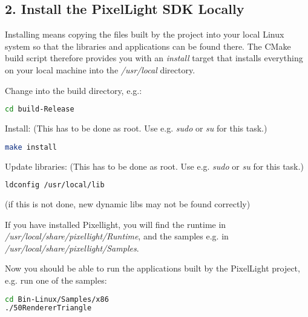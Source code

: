 \subsection{2. Install the PixelLight \ac{SDK} Locally}
Installing means copying the files built by the project into your local Linux system so that the libraries and applications can be found there. The CMake build script therefore provides you with an \emph{install} target that installs everything on your local machine into the \emph{/usr/local} directory.

Change into the build directory, e.g.:
\begin{lstlisting}[language=sh]
cd build-Release
\end{lstlisting}

Install: (This has to be done as root. Use e.g. \emph{sudo} or \emph{su} for this task.)
\begin{lstlisting}[language=sh]
make install
\end{lstlisting}

Update libraries: (This has to be done as root. Use e.g. \emph{sudo} or \emph{su} for this task.)
\begin{lstlisting}[language=sh]
ldconfig /usr/local/lib
\end{lstlisting}
(if this is not done, new dynamic libs may not be found correctly)

If you have installed Pixellight, you will find the runtime in \emph{/usr/local/share/pixellight/Runtime}, and the samples e.g. in \emph{/usr/local/share/pixellight/Samples}.

Now you should be able to run the applications built by the PixelLight project, e.g. run one of the samples:
\begin{lstlisting}[language=sh]
cd Bin-Linux/Samples/x86
./50RendererTriangle
\end{lstlisting}
